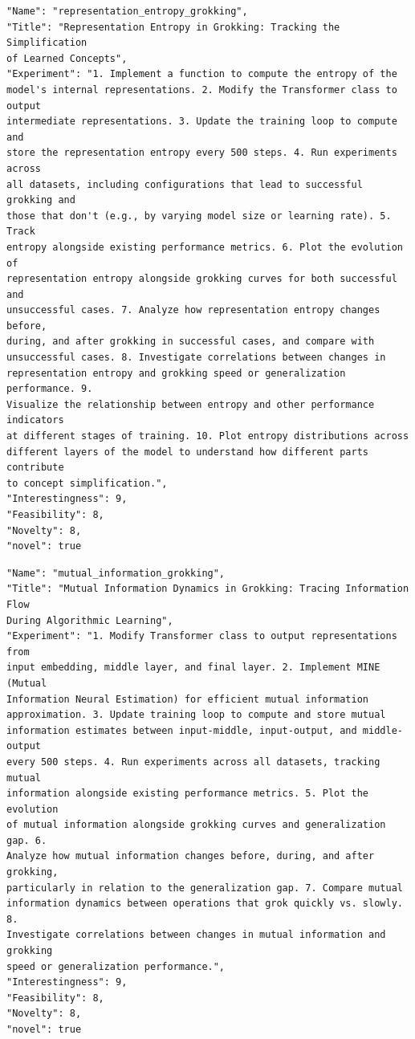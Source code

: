 \documentclass[11pt, a4paper]{include/gdm_format}
\begin{document}
\begin{tcolorbox}[breakable,colback=blue!5!white, colframe=blue!75!black, title=Idea 45/50 - \texttt{representation\_entropy\_grokking}]
\small
\begin{verbatim}
"Name": "representation_entropy_grokking",
"Title": "Representation Entropy in Grokking: Tracking the Simplification
of Learned Concepts",
"Experiment": "1. Implement a function to compute the entropy of the
model's internal representations. 2. Modify the Transformer class to output
intermediate representations. 3. Update the training loop to compute and
store the representation entropy every 500 steps. 4. Run experiments across
all datasets, including configurations that lead to successful grokking and
those that don't (e.g., by varying model size or learning rate). 5. Track
entropy alongside existing performance metrics. 6. Plot the evolution of
representation entropy alongside grokking curves for both successful and
unsuccessful cases. 7. Analyze how representation entropy changes before,
during, and after grokking in successful cases, and compare with
unsuccessful cases. 8. Investigate correlations between changes in
representation entropy and grokking speed or generalization performance. 9.
Visualize the relationship between entropy and other performance indicators
at different stages of training. 10. Plot entropy distributions across
different layers of the model to understand how different parts contribute
to concept simplification.",
"Interestingness": 9,
"Feasibility": 8,
"Novelty": 8,
"novel": true
\end{verbatim}
\end{tcolorbox}

\begin{tcolorbox}[breakable,colback=blue!5!white, colframe=blue!75!black, title=Idea 46/50 - \texttt{mutual\_information\_grokking}]
\small
\begin{verbatim}
"Name": "mutual_information_grokking",
"Title": "Mutual Information Dynamics in Grokking: Tracing Information Flow
During Algorithmic Learning",
"Experiment": "1. Modify Transformer class to output representations from
input embedding, middle layer, and final layer. 2. Implement MINE (Mutual
Information Neural Estimation) for efficient mutual information
approximation. 3. Update training loop to compute and store mutual
information estimates between input-middle, input-output, and middle-output
every 500 steps. 4. Run experiments across all datasets, tracking mutual
information alongside existing performance metrics. 5. Plot the evolution
of mutual information alongside grokking curves and generalization gap. 6.
Analyze how mutual information changes before, during, and after grokking,
particularly in relation to the generalization gap. 7. Compare mutual
information dynamics between operations that grok quickly vs. slowly. 8.
Investigate correlations between changes in mutual information and grokking
speed or generalization performance.",
"Interestingness": 9,
"Feasibility": 8,
"Novelty": 8,
"novel": true
\end{verbatim}
\end{tcolorbox}
\end{document}
